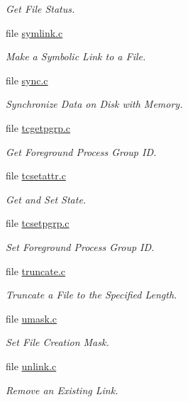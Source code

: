 \begin{DoxyCompactItemize}
\begin{DoxyCompactList}\small\item\em Get File Status. \end{DoxyCompactList}\item 
file \mbox{\hyperlink{symlink_8c}{symlink.\+c}}
\begin{DoxyCompactList}\small\item\em Make a Symbolic Link to a File. \end{DoxyCompactList}\item 
file \mbox{\hyperlink{sync_8c}{sync.\+c}}
\begin{DoxyCompactList}\small\item\em Synchronize Data on Disk with Memory. \end{DoxyCompactList}\item 
file \mbox{\hyperlink{tcgetpgrp_8c}{tcgetpgrp.\+c}}
\begin{DoxyCompactList}\small\item\em Get Foreground Process Group ID. \end{DoxyCompactList}\item 
file \mbox{\hyperlink{tcsetattr_8c}{tcsetattr.\+c}}
\begin{DoxyCompactList}\small\item\em Get and Set State. \end{DoxyCompactList}\item 
file \mbox{\hyperlink{tcsetpgrp_8c}{tcsetpgrp.\+c}}
\begin{DoxyCompactList}\small\item\em Set Foreground Process Group ID. \end{DoxyCompactList}\item 
file \mbox{\hyperlink{truncate_8c}{truncate.\+c}}
\begin{DoxyCompactList}\small\item\em Truncate a File to the Specified Length. \end{DoxyCompactList}\item 
file \mbox{\hyperlink{umask_8c}{umask.\+c}}
\begin{DoxyCompactList}\small\item\em Set File Creation Mask. \end{DoxyCompactList}\item 
file \mbox{\hyperlink{unlink_8c}{unlink.\+c}}
\begin{DoxyCompactList}\small\item\em Remove an Existing Link. \end{DoxyCompactList}\item 

\end{DoxyCompactItemize}
